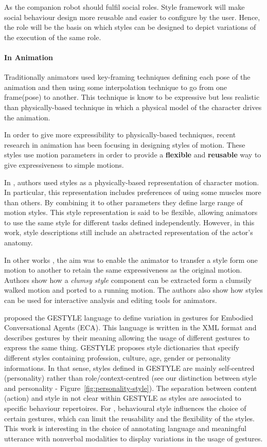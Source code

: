 \documentclass[smallextended]{svjour3}
\begin{document}
As the companion robot should fulfil social roles.
Style framework  will make social behaviour design more reusable and easier to configure by the user. 
Hence, the role will be the basis on which styles can be designed to depict variations of the execution of the same role. 


\paragraph{In Animation}
Traditionally animators used key-framing techniques defining each pose of the animation and then using some interpolation technique to go from one frame(pose) to another. 
This technique is know to be expressive but less realistic than physically-based technique in which a physical model of the character drives the animation.

In order to give more expressibility to physically-based techniques, recent research in animation has been focusing in designing styles of motion. 
These styles use motion parameters in order to provide a \textbf{flexible} and \textbf{reusable} way to give expressiveness to simple motions.

In \cite{Liu2005}, authors used styles as a physically-based representation of character motion. 
In particular, this representation includes preferences of using some muscles more than others.
By combining it to other parameters they define large range of motion styles.
This style representation is said to be flexible, allowing animators to use the same style for different tasks defined independently. However, in this work, style descriptions still include an abstracted representation of the actor's anatomy.

In other works \cite{shapiro2006style}, the aim was to enable the animator to transfer a style form one motion to another to retain the same expressiveness as the original motion.
Authors show how a\textit{ clumsy style} component can be extracted form a clumsily walked motion and ported to a running motion. 
The authors also show how styles can be used for interactive analysis and editing tools for animators.

\cite{Noot2004} proposed the GESTYLE language to define variation in gestures for Embodied Conversational Agents (ECA). 
This language is written in the XML format and describes gestures by their meaning allowing the usage of different gestures to express the same thing.
GESTYLE proposes style dictionaries that specify different styles containing profession, culture, age, gender or personality informations.
In that sense, styles defined in GESTYLE are mainly self-centred (personality) rather than role/context-centred (see our distinction between style and personality - Figure~\ref{fig:personality-style}). 
The separation between content (action) and style in not clear within GESTYLE as styles are associated to specific behaviour repertoires.
For \cite{Noot2004}, behavioural style influences the choice of certain gestures, which can limit the reusability and the flexibility of the styles.
This work is interesting in the choice of annotating language and meaningful utterance with nonverbal modalities to display variations in the usage of gestures.
\end{document}
